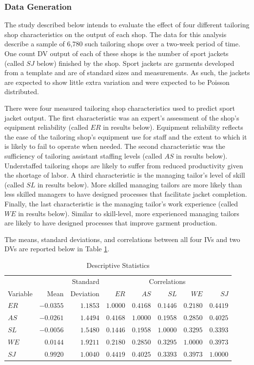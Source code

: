 \documentclass[ShortAfour,times,sageapa]{sagej}
\begin{document}
		\subsubsection{Data Generation}
	
	The study described below intends to evaluate the effect of four different tailoring shop characteristics on the output of each shop.
	The data for this analysis describe a sample of 6,780 such tailoring shops over a two-week period of time.
	One count DV output of each of these shops is the number of sport jackets (called $SJ$ below) finished by the shop.
	Sport jackets are garments developed from a template and are of standard sizes and measurements.
	As such, the jackets are expected to show little extra variation and were expected to be Poisson distributed.
	
	There were four measured tailoring shop characteristics used to predict sport jacket output. 
	The first characteristic was an expert's assessment of the shop's equipment reliability (called $ER$ in results below).
	Equipment reliability reflects the ease of the tailoring shop's equipment use for staff and the extent to which it is likely to fail to operate when needed. 
	The second characteristic was the sufficiency of tailoring assistant staffing levels (called $AS$ in results below).
	Understaffed tailoring shops are likely to suffer from reduced productivity given the shortage of labor.
	A third characteristic is the managing tailor's level of skill (called $SL$ in results below).
	More skilled managing tailors are more likely than less skilled managers to have designed processes that facilitate jacket completion.
	Finally, the last characteristic is the managing tailor's work experience (called $WE$ in results below).
	Similar to skill-level, more experienced managing tailors are likely to have designed processes that improve garment production.
	
	The means, standard deviations, and correlations between all four IVs and two DVs are reported below in Table \ref{tab:desc}. 
	
	\begin{table}[h!]
		\centering
		\caption{\centering Descriptive Statistics} 
		\begin{tabular}{lrr|rrrrr}
			\toprule
			&  & Standard & \multicolumn{5}{c}{Correlations} \\ 
			\cmidrule(lr){4-8}
			Variable & Mean & Deviation & $ER$ & $AS$ & $SL$ & $WE$ & $SJ$ \\ 
			\midrule
			$ER$ & $-0.0355$ & $1.1853$ & $1.0000$ & $0.4168$ & $0.1446$ & $0.2180$ & $0.4419$ \\ 
			$AS$ & $-0.0261$ & $1.4494$ & $0.4168$ & $1.0000$ & $0.1958$ & $0.2850$ & $0.4025$ \\ 
			$SL$ & $-0.0056$ & $1.5480$ & $0.1446$ & $0.1958$ & $1.0000$ & $0.3295$ & $0.3393$ \\ 
			$WE$ & $0.0144$ & $1.9211$ & $0.2180$ & $0.2850$ & $0.3295$ & $1.0000$ & $0.3973$ \\ 
			$SJ$ & $0.9920$ & $1.0040$ & $0.4419$ & $0.4025$ & $0.3393$ & $0.3973$ & $1.0000$ \\ 
			\bottomrule
		\end{tabular}
		\label{tab:desc}
	\end{table}
\end{document}
